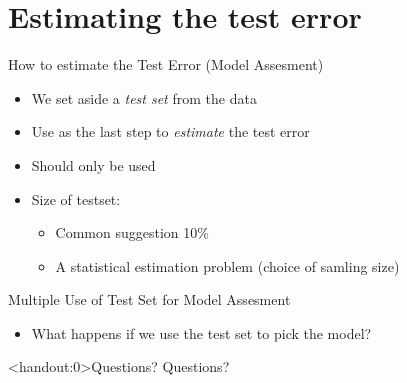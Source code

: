 \documentclass[10pt,handout]{beamer}
\begin{document}
\section{Estimating the test error}

\begin{frame}{How to estimate the Test Error (Model Assesment)}

\begin{itemize}
\item We set aside a \emph{test set} from the data
\item Use as the last step to \emph{estimate} the test error
\item Should only be used \pause
\item Size of testset:
\begin{itemize}
\item Common suggestion 10\%
\item A statistical estimation problem (choice of samling size)
\end{itemize}
\end{itemize}

\end{frame}


\begin{frame}{Multiple Use of Test Set for Model Assesment}

\begin{itemize}
\item What happens if we use the test set to pick the model?
\end{itemize}

\end{frame}

\begin{frame}<handout:0>{Questions?}
Questions?
\end{frame}



\end{document}

